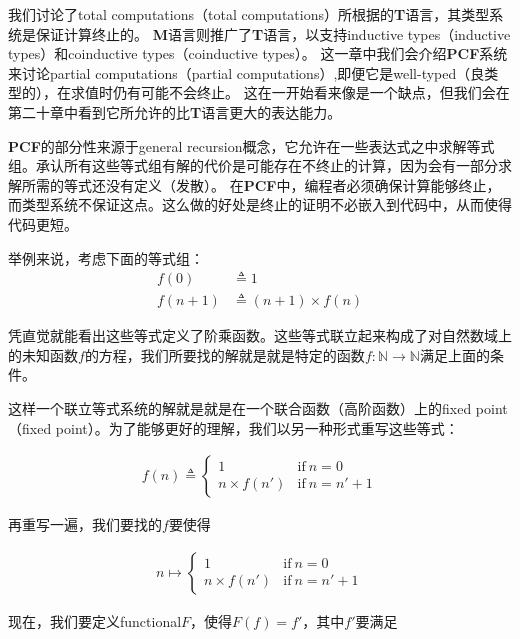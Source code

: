 我们讨论了\gls{total computations}（total computations）所根据的\textbf{T}语言，其类型系统是保证计算终止的。
\textbf{M}语言则推广了\textbf{T}语言，以支持\gls{inductive types}（inductive types）和\gls{coinductive types}（coinductive types）。
这一章中我们会介绍\textbf{PCF}系统来讨论\gls{partial computations}（partial computations）,即便它是\gls{well-typed}（良类型的），在求值时仍有可能不会终止。
这在一开始看来像是一个缺点，但我们会在第二十章中看到它所允许的比\textbf{T}语言更大的表达能力。

\textbf{PCF}的部分性来源于\gls{general recursion}概念，它允许在一些表达式之中求解等式组。承认所有这些等式组有解的代价是可能存在不终止的计算，因为会有一部分求解所需的等式还没有定义（发散）。
在\textbf{PCF}中，编程者必须确保计算能够终止，而类型系统不保证这点。这么做的好处是终止的证明不必嵌入到代码中，从而使得代码更短。

举例来说，考虑下面的等式组：
\begin{align*}
	f(0) &\triangleq 1 \\
	f(n + 1) &\triangleq (n + 1) \times f(n)
\end{align*}

凭直觉就能看出这些等式定义了阶乘函数。这些等式联立起来构成了对自然数域上的未知函数\(f\)的方程，我们所要找的解就是就是特定的函数\(f: \mathbb{N} \rightarrow \mathbb{N}\)满足上面的条件。

这样一个联立等式系统的解就是就是在一个联合函数（高阶函数）上的\gls{fixed point}（fixed point）。为了能够更好的理解，我们以另一种形式重写这些等式：

\begin{align*}
	f(n) \triangleq 
	\left\{
	\begin{array}{ll}
		1 & \mathrm{if\ } n = 0 \\
		n \times f(n') & \mathrm{if\ } n = n' + 1
	\end{array}
	\right.
\end{align*}

再重写一遍，我们要找的\(f\)要使得

\begin{align*}
	n \mapsto 
	\left\{
	\begin{array}{ll}
		1 & \mathrm{if\ } n = 0 \\
		n \times f(n') & \mathrm{if\ } n = n' + 1
	\end{array}
	\right.
\end{align*}

现在，我们要定义\gls{functional}\(F\)，使得\(F(f)=f'\)，其中\(f'\)要满足

